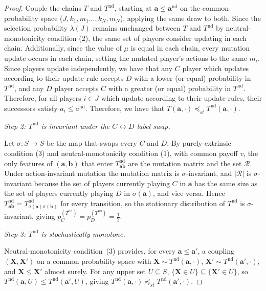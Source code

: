 \documentclass{article}
\begin{document}
\begin{proof}
    Couple the chains \(T\) and \(T^{\mathrm{nd}}\), starting at \(\mathbf{a}
    \leq \mathbf{a}^{\mathrm{nd}}\) on the common probability space (\(J,
    k_1,m_1 \dots, k_N,m_N\)), applying the same draw to both. Since the
    selection probability \(\lambda(J)\) remains unchanged between \(T\) and
    \(T^{\mathrm{nd}}\) by neutral-monotonicity condition (2), the same set of
    players consider updating in each chain. Additionally, since the value of
    \(\mu\) is equal in each chain, every mutation update occurs in each chain,
    setting the mutated player's actions to the same \(m_i\). Since players
    update independently, we have that any \(C\) player which updates according
    to their update rule accepts \(D\) with a lower (or equal) probability in
    \(T^{\mathrm{nd}}\), and any \(D\) player accepts \(C\) with a greater (or
    equal) probability in \(T^{\mathrm{nd}}\). Therefore, for all players \(i
    \in J\) which update according to their update rules, their successors
    satisfy \(a_i \leq a^{\mathrm{nd}}\). Therefore, we have that
    \(T(\mathbf{a}, \cdot) \preceq_{st} T^{\mathrm{nd}}(\mathbf{a}, \cdot)\).

    \medskip
    \noindent\textit{Step 2: \(T^{\mathrm{nd}}\) is invariant under the \(C \leftrightarrow D\) label swap.}

    Let \(\sigma : S \to S\) be the map that swaps every \(C\) and \(D\). By
    purely-extrinsic condition (3) and neutral-monotonicity condition (1), with
    common payoff \(v\), the only features of \((\mathbf{a}, \mathbf{b})\) that
    enter \(T^{\mathrm{nd}}_{\mathbf{ab}}\) are the mutation matrix and the set
    \(\mathcal{R}\). Under action-invariant mutation the mutation matrix is
    \(\sigma\)-invariant, and \(|\mathcal{R}|\) is \(\sigma\)-invariant because
    the set of players currently playing \(C\) in \(\mathbf{a}\) has the same
    size as the set of players currently playing \(D\) in
    \(\sigma(\mathbf{a})\), and vice versa. Hence
    \(T^{\mathrm{nd}}_{\mathbf{ab}} =
    T^{\mathrm{nd}}_{\sigma(\mathbf{a})\sigma(\mathbf{b})}\) for every
    transition, so the stationary distribution of \(T^{\mathrm{nd}}\) is
    \(\sigma\)-invariant, giving \(p_C^{(T^{\mathrm{nd}})} =
    p_D^{(T^{\mathrm{nd}})} = \frac{1}{2}\).

    \medskip
    \noindent\textit{Step 3: \(T^{\mathrm{nd}}\) is stochastically monotone.}

    Neutral-monotonicity condition~(3) provides, for every \(\mathbf{a} \leq \mathbf{a}'\), a coupling
    \((\mathbf{X}, \mathbf{X}')\) on a common probability space with \(\mathbf{X}
    \sim T^{\mathrm{nd}}(\mathbf{a}, \cdot)\), \(\mathbf{X}' \sim
    T^{\mathrm{nd}}(\mathbf{a}', \cdot)\), and \(\mathbf{X} \leq \mathbf{X}'\)
    almost surely. For any upper set \(U \subseteq S\), \(\{\mathbf{X} \in U\}
    \subseteq \{\mathbf{X}' \in U\}\), so \(T^{\mathrm{nd}}(\mathbf{a}, U) \leq
    T^{\mathrm{nd}}(\mathbf{a}', U)\), giving \(T^{\mathrm{nd}}(\mathbf{a}, \cdot)
    \preceq_{st} T^{\mathrm{nd}}(\mathbf{a}', \cdot)\).


\end{proof}
\end{document}
